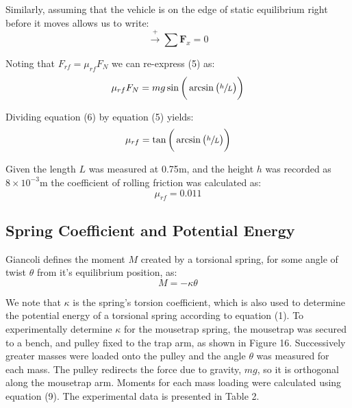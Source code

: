 \documentclass[a4paper]{article}
\newlength{\arrow}
\begin{document}
Similarly, assuming that the vehicle is on the edge of static equilibrium right before it moves allows us to write:
\begin{equation}
	\stackrel{+}\rightarrow \sum \boldsymbol{F}_x = 0
\end{equation}

Noting that $F_{rf} = \mu_{rf} F_N$ we can re-express (5) as:
\begin{equation}
	\mu_{rf} F_N = mg \sin \bigg( \arcsin\big( \sfrac{h}{L} \big) \bigg)
\end{equation}

Dividing equation (6) by equation (5) yields:
\begin{equation}
	\mu_{rf} = \tan \bigg( \arcsin\big( \sfrac{h}{L} \big) \bigg)
\end{equation}

Given the length $L$ was measured at 0.75$\si{\meter}$, and the height $h$ was recorded as $8 \times 10^{-3} \si{\meter}$ the coefficient of rolling friction was calculated as:
\begin{equation}
	\mu_{rf} = 0.011
\end{equation}


\subsection{Spring Coefficient and Potential Energy}
Giancoli defines the moment $M$ created by a torsional spring, for some angle of twist $\theta$ from it's equilibrium position, as:
\begin{equation}
	M = -\kappa \theta
\end{equation} 

We note that $\kappa$ is the spring's torsion coefficient, which is also used to determine the potential energy of a torsional spring according to equation (1). To experimentally determine $\kappa$ for the mousetrap spring, the mousetrap was secured to a bench, and pulley fixed to the trap arm, as shown in Figure 16. Successively greater masses were loaded onto the pulley and the angle $\theta$ was measured for each mass. The pulley redirects the force due to gravity, $mg$, so it is orthogonal along the mousetrap arm. Moments for each mass loading were calculated using equation (9). The experimental data is presented in Table 2.
\end{document}
